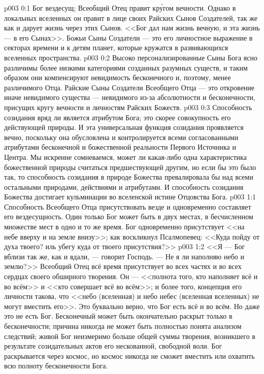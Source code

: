 \author{Божественный Советник}
\vs p003 0:1 Бог вездесущ; Всеобщий Отец правит кр\'угом вечности. Однако в локальных вселенных он правит в лице своих Райских Сынов Создателей, так же как и дарует жизнь через этих Сынов. <<Бог дал нам жизнь вечную, и эта жизнь --- в его Сынах>>. Божьи Сыны Создатели --- это его личностное выражение в секторах времени и к детям планет, которые кружатся в развивающихся вселенных пространства.
\vs p003 0:2 Высоко персонализированные Сыны Бога ясно различимы более низкими категориями созданных разумных существ, и таким образом они компенсируют невидимость бесконечного и, поэтому, менее различимого Отца. Райские Сыны Создатели Всеобщего Отца --- это откровение иначе невидимого существа --- невидимого из\hyp{}за абсолютности и бесконечности, присущих кругу вечности и личностям Райских Божеств.
\vs p003 0:3 \pc Способность созидания вряд ли является атрибутом Бога; это скорее совокупность его действующей природы. И эта универсальная функция созидания проявляется вечно, поскольку она обусловлена и контролируется всеми согласованными атрибутами бесконечной и божественной реальности Первого Источника и Центра. Мы искренне сомневаемся, может ли какая\hyp{}либо одна характеристика божественной природы считаться предшествующей другим, но если бы это было так, то способность созидания в природе Божества превалировала бы над всеми остальными природами, действиями и атрибутами. И способность созидания Божества достигает кульминации во вселенской истине Отцовства Бога.
\vs p003 1:1 Способность Всеобщего Отца присутствовать везде и одновременно составляет его вездесущность. Один только Бог может быть в двух местах, в бесчисленном множестве мест в одно и то же время. Бог одновременно присутствует <<на небе вверху и на земле внизу>>; как воскликнул Псалмопевец: <<Куда пойду от духа твоего? иль убегу куда от твоего присутствия?>>
\vs p003 1:2 <<Я --- Бог вблизи так же, как и вдали, --- говорит Господь. --- Не я ли наполняю небо и землю?>> Всеобщий Отец всё время присутствует во всех частях и во всех сердцах своего обширного творения. Он --- <<полнота того, кто наполняет всё и во всём>> и <<кто совершает всё во всём>>; и более того, концепция его личности такова, что <<небо (вселенная) и небо небес (вселенная вселенных) не могут вместить его>>. Это буквально верно, что Бог есть всё и во всём. Но даже это не есть  Бог. Бесконечный может быть окончательно раскрыт только в бесконечности; причина никогда не может быть полностью понята анализом следствий; живой Бог неизмеримо больше общей суммы творения, возникшего в результате созидательных актов его нескованной, свободной воли. Бог раскрывается через космос, но космос никогда не сможет вместить или охватить всю полноту бесконечности Бога.
